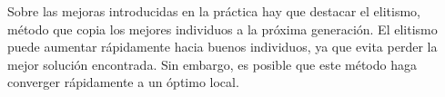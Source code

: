 \documentclass[12pt]{article}
\begin{document}
Sobre las mejoras introducidas en la práctica hay que destacar el elitismo, método que copia los mejores individuos a la
próxima generación. El elitismo puede aumentar rápidamente hacia buenos individuos, ya que evita perder la mejor solución encontrada. Sin embargo,
es posible que este método haga converger rápidamente a un óptimo local.
\end{document}
